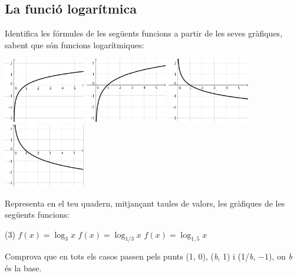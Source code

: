\subsection{La funció logarítmica}

\begin{mylist}
\exer  Identifica les fórmules de les següents funcions a partir de les seves gràfiques, sabent que són funcions logarítmiques:

\includegraphics*[width=1.4in]{img-05/ex25fe-a}
\includegraphics*[width=1.4in]{img-05/ex25fe-b} 
\includegraphics*[width=1.4in]{img-05/ex25fe-c}
\includegraphics*[width=1.4in]{img-05/ex25fe-d}


\answers{[$y=\log_4 x$, $y=\ln x$, $y=\log_{1/4} x=-\log_4 x$, $y=\log_{1/e} x=-\ln x$]}

\exer  Representa en el teu quadern, mitjançant taules de valors, les gràfiques de les següents funcions:
\begin{tasks}(3)
\task  $f(x)=\log _{3} x$ \task  $f(x)=\log _{1/3} x$  \task  $f(x)=\log _{1,5} x$
\end{tasks}

Comprova que en tots els casos passen pels punts (1, 0), (\textit{b}, 1) i (1/\textit{b}, $-1$), on \textit{b} és la base.


\end{mylist}

